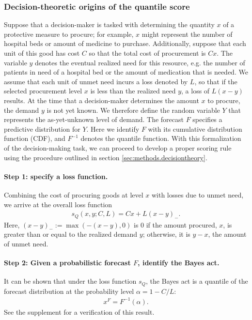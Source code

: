 \documentclass{article}
\begin{document}
\subsubsection{Decision-theoretic origins of the quantile score}
\label{sec:methods.quantileloss.quantile}

Suppose that a decision-maker is tasked with determining the quantity $x$ of a protective measure to procure; for example, $x$ might represent the number of hospital beds or amount of medicine to purchase. Additionally, suppose that each unit of this good has cost $C$ so that the total cost of procurement is $Cx$. The variable $y$ denotes the eventual realized need for this resource, e.g. the number of patients in need of a hospital bed or the amount of medication that is needed. We assume that each unit of unmet need incurs a loss denoted by $L$, so that if the selected procurement level $x$ is less than the realized need $y$, a loss of $L(x-y)$ results. At the time that a decision-maker determines the amount $x$ to procure, the demand $y$ is not yet known. We therefore define the random variable $Y$ that represents the as-yet-unknown level of demand. The forecast $F$ specifies a predictive distribution for $Y$. Here we identify $F$ with its cumulative distribution function (CDF), and $F^{-1}$ denotes the quantile function. With this formalization of the decision-making task, we can proceed to develop a proper scoring rule using the procedure outlined in section \ref{sec:methods.decisiontheory}.

\paragraph{Step 1: specify a loss function.} Combining the cost of procuring goods at level $x$ with losses due to unmet need, we arrive at the overall loss function
\begin{align}
s_Q(x,y; C, L) = Cx + L(x-y)_-.
\end{align}
Here, $(x - y)_- := \max(-(x - y),0)$ is $0$ if the amount procured, $x$, is greater than or equal to the realized demand $y$; otherwise, it is $y - x$, the amount of unmet need.

\paragraph{Step 2: Given a probabilistic forecast $F$, identify the Bayes act.} It can be shown that under the loss function $s_Q$, the Bayes act is a quantile of the forecast distribution at the probability level $\alpha = 1 - C/L$:
\begin{align}
x^F = F^{-1}(\alpha).
\end{align}
See the supplement for a verification of this result.
\end{document}
